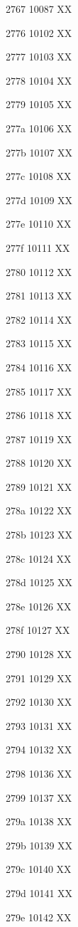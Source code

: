 \documentclass[11pt]{article}
\begin{document}
2767 10087 X{}X

2776 10102 X{}X

2777 10103 X{}X

2778 10104 X{}X

2779 10105 X{}X

277a 10106 X{}X

277b 10107 X{}X

277c 10108 X{}X

277d 10109 X{}X

277e 10110 X{}X

277f 10111 X{}X

2780 10112 X{}X

2781 10113 X{}X

2782 10114 X{}X

2783 10115 X{}X

2784 10116 X{}X

2785 10117 X{}X

2786 10118 X{}X

2787 10119 X{}X

2788 10120 X{}X

2789 10121 X{}X

278a 10122 X{}X

278b 10123 X{}X

278c 10124 X{}X

278d 10125 X{}X

278e 10126 X{}X

278f 10127 X{}X

2790 10128 X{}X

2791 10129 X{}X

2792 10130 X{}X

2793 10131 X{}X

2794 10132 X{}X

2798 10136 X{}X

2799 10137 X{}X

279a 10138 X{}X

279b 10139 X{}X

279c 10140 X{}X

279d 10141 X{}X

279e 10142 X{}X
\end{document}
